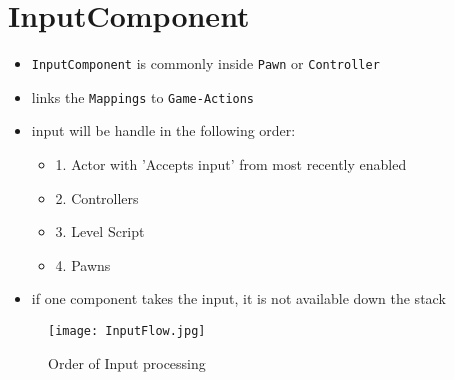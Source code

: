 \documentclass{scrbook}
\newcommand{\code}[1]{\colorbox{mygray}{\lstinline|#1|}}
\begin{document}
        \section{InputComponent}
            \begin{itemize}
                \item \code{InputComponent} is commonly inside \code{Pawn} or \code{Controller}
                \item links the \code{Mappings} to \code{Game-Actions}
                \item input will be handle in the following order:
                \begin{itemize}
                    \item 1. Actor with 'Accepts input' from most recently enabled
                    \item 2. Controllers
                    \item 3. Level Script
                    \item 4. Pawns
                \end{itemize}
                \item if one component takes the input, it is not available down the stack
            \end{itemize}

            \begin{figure}[ht]
                \texttt{[image: InputFlow.jpg]}
                \caption{Order of Input processing}
            \end{figure}

        
\end{document}
